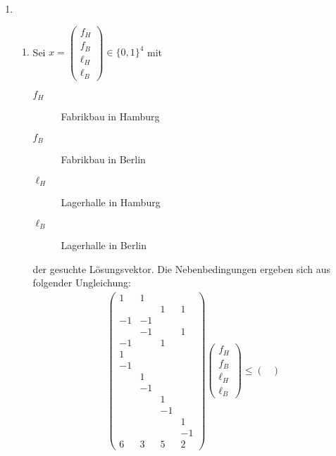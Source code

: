 \begin{enumerate}[1.]
  \item
    \begin{enumerate}[1.]
      \item Sei
        $x = \begin{pmatrix} f_H\\ f_B\\ \ell_H\\ \ell_B \end{pmatrix} \in {\{0, 1\}}^4$
        mit
        \begin{description}
          \item[$f_H$] Fabrikbau in Hamburg
          \item[$f_B$] Fabrikbau in Berlin
          \item[$\ell_H$] Lagerhalle in Hamburg
          \item[$\ell_B$] Lagerhalle in Berlin
        \end{description}
        der gesuchte Lösungsvektor. Die Nebenbedingungen ergeben sich aus
        folgender Ungleichung:
        \begin{align*}
          \begin{pmatrix}
            1  & 1  &    & \\
               &    & 1  & 1\\
            -1 & -1 &    & \\
               & -1 &    & 1\\
            -1 &    & 1  & \\
            1  &    &    & \\
            -1 &    &    & \\
               & 1  &    & \\
               & -1 &    & \\
               &    & 1  & \\
               &    & -1 & \\
               &    &    & 1\\
               &    &    & -1\\
            6  & 3  & 5  & 2
          \end{pmatrix}
          \begin{pmatrix}
            f_H\\
            f_B\\
            \ell_H\\
            \ell_B
          \end{pmatrix}
          \leq
          \begin{pmatrix}

\end{pmatrix}
\end{align*}
\end{enumerate}
\end{enumerate}
